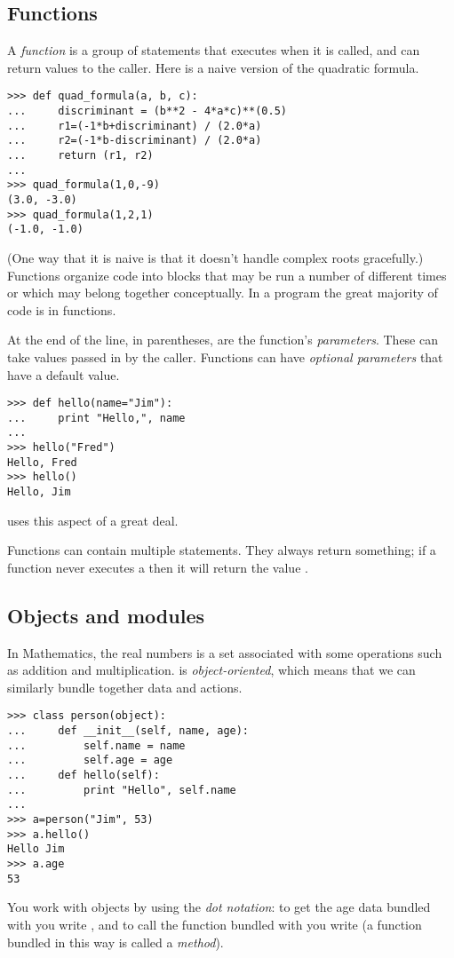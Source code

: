 \subsection{Functions}
A \textit{function} is a group of statements that executes when it is called,
and can return values to the caller.
Here is a naive version of the quadratic formula.
\begin{lstlisting}[style=python]
>>> def quad_formula(a, b, c):
...     discriminant = (b**2 - 4*a*c)**(0.5)
...     r1=(-1*b+discriminant) / (2.0*a)
...     r2=(-1*b-discriminant) / (2.0*a)
...     return (r1, r2)
... 
>>> quad_formula(1,0,-9)
(3.0, -3.0)
>>> quad_formula(1,2,1)
(-1.0, -1.0)
\end{lstlisting}
(One way that it is naive is that it doesn't handle complex roots gracefully.)
Functions organize code into blocks that may be 
run a number of different times or which may belong together conceptually. 
In a \python{} program the great majority of code is in functions. 

At the end of the  line, in parentheses, are
the function's \textit{parameters}. 
These can take values 
passed in by the caller.
Functions can have \textit{optional parameters} that have a default value.
\begin{lstlisting}[style=python]
>>> def hello(name="Jim"):
...     print "Hello,", name
... 
>>> hello("Fred")
Hello, Fred
>>> hello()
Hello, Jim  
\end{lstlisting}
\Sage{} uses this aspect of \python{} a great deal.

Functions can contain multiple  statements.
They always return something; 
if a function never executes a  then it will
return the value .




\subsection{Objects and modules}
In Mathematics, the real numbers is a set associated with some operations
such as addition and multiplication.
\python{} is \textit{object-oriented}, which means that we can similarly bundle
together data and actions.
\begin{lstlisting}[style=python]
>>> class person(object):
...     def __init__(self, name, age):
...         self.name = name
...         self.age = age
...     def hello(self):
...         print "Hello", self.name
... 
>>> a=person("Jim", 53)
>>> a.hello()
Hello Jim
>>> a.age
53  
\end{lstlisting}
You work with objects by using the \textit{dot notation}:
to get the age data bundled with 
you write , and to 
call the  function bundled
with  you write
(a function bundled in this way is called a \textit{method}).

